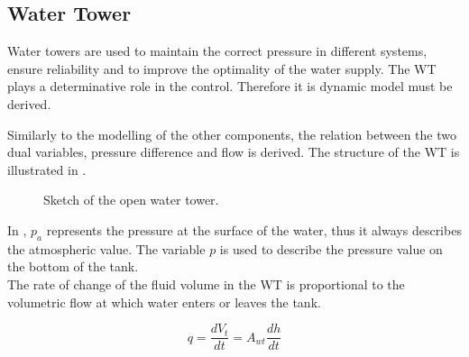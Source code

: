 \subsection{Water Tower} 
\label{WaterTankModel}

Water towers are used to maintain the correct pressure in different systems, ensure reliability and to improve the optimality of the water supply. The WT plays a determinative role in the control. Therefore it is dynamic model must be derived. 

Similarly to the modelling of the other components, the relation between the two dual variables, pressure difference and flow is derived. The structure of the WT is illustrated in .


\begin{figure}[H]
\centering
 
\caption{Sketch of the open water tower.}
\label{fig:watertower_sketch}
\end{figure}

In , $p_a$ represents the pressure at the surface of the water, thus it always describes the atmospheric value. The variable $p$ is used to describe the pressure value on the bottom of the tank. \\
The rate of change of the fluid volume in the WT is proportional to the volumetric flow at which water enters or leaves the tank. 

\begin{equation}
  q = \frac{dV_t}{dt} = A_{wt} \frac{dh}{dt}
  \label{Flowequation}
\end{equation}

